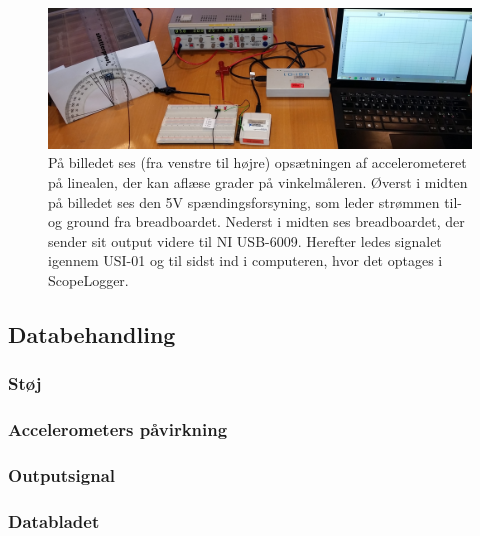 \begin{figure}[H]
	\centering
	\includegraphics[scale=0.14]{figures/cProblemloesning/Pilotforsoeg1.jpg}
	\caption{På billedet ses (fra venstre til højre) opsætningen af accelerometeret på linealen, der kan aflæse grader på vinkelmåleren. Øverst i midten på billedet ses den 5V spændingsforsyning, som leder strømmen til- og ground fra breadboardet. Nederst i midten ses breadboardet, der sender sit output videre til NI USB-6009. Herefter ledes signalet igennem USI-01 og til sidst ind i computeren, hvor det optages i ScopeLogger.}
	\label{pforsoeg2}
\end{figure}


\subsection{Databehandling}
\subsubsection{Støj}

\subsubsection{Accelerometers påvirkning}
\subsubsection{Outputsignal}

\subsubsection{Databladet}